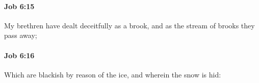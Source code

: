 		\paragraph{Job 6:15} %
			\label{JOB-6-15}

			My brethren have dealt deceitfully as a brook, and as the stream of brooks they pass away;


		\paragraph{Job 6:16} %
			\label{JOB-6-16}

			Which are blackish by reason of the ice, and wherein the snow is hid:


